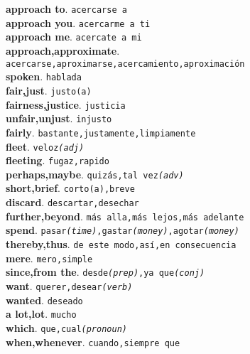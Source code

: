 \documentclass[twocolumn]{article}
\begin{document}
	\textsf{\textbf{approach to}}. \texttt{acercarse a}\\
	\textsf{\textbf{approach you}}. \texttt{acercarme a ti}\\
	\textsf{\textbf{approach me}}. \texttt{acercate a mi}\\
	\textsf{\textbf{approach,approximate}}.\\
        \texttt{acercarse,aproximarse,acercamiento,aproximaci\'on}\\
	\textsf{\textbf{spoken}}. \texttt{hablada}\\
	\textsf{\textbf{fair,just}}. \texttt{justo(a)}\\
	\textsf{\textbf{fairness,justice}}. \texttt{justicia}\\
	\textsf{\textbf{unfair,unjust}}. \texttt{injusto}\\
	\textsf{\textbf{fairly}}. \texttt{bastante,justamente,limpiamente}\\
	\textsf{\textbf{fleet}}. \texttt{veloz{\scriptsize \textsl{(adj)}}}\\
	\textsf{\textbf{fleeting}}. \texttt{fugaz,rapido}\\
	\textsf{\textbf{perhaps,maybe}}. \texttt{quiz\'as,tal vez{\scriptsize \textsl{(adv)}}}\\
	\textsf{\textbf{short,brief}}. \texttt{corto(a),breve}\\
	\textsf{\textbf{discard}}. \texttt{descartar,desechar}\\
	\textsf{\textbf{further,beyond}}. \texttt{m\'as alla,m\'as lejos,m\'as adelante}\\
	\textsf{\textbf{spend}}. \texttt{pasar{\scriptsize \textsl{(time)}},gastar{\scriptsize \textsl{(money)}},agotar{\scriptsize \textsl{(money)}}}\\
	\textsf{\textbf{thereby,thus}}. \texttt{de este modo,as\'i,en consecuencia}\\
	\textsf{\textbf{mere}}. \texttt{mero,simple}\\
	\textsf{\textbf{since,from the}}. \texttt{desde{\scriptsize \textsl{(prep)}},ya que{\scriptsize \textsl{(conj)}}}\\
	\textsf{\textbf{want}}. \texttt{querer,desear{\scriptsize \textsl{(verb)}}}\\
	\textsf{\textbf{wanted}}. \texttt{deseado}\\
	\textsf{\textbf{a lot,lot}}. \texttt{mucho}\\
	\textsf{\textbf{which}}. \texttt{que,cual{\scriptsize \textsl{(pronoun)}}}\\
	\textsf{\textbf{when,whenever}}. \texttt{cuando,siempre que}\\
\end{document}
